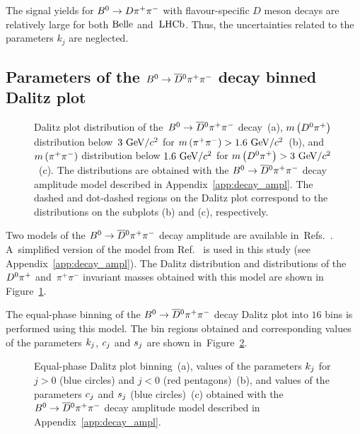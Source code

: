 \documentclass[a4paper,11pt]{article}
\begin{document}
The signal yields for $B^0\to D\pi^+\pi^-$ with flavour-specific $D$ 
meson decays are relatively large for both $\mathrm{Belle}$ and~$\mathrm{LHCb}$.  Thus, 
the uncertainties related to the parameters $k_j$ are neglected.

\subsection{Parameters of the \texorpdfstring{$B^0\to\overline{D}{}^0\pi^+\pi^-$}{B0 -> anti-D0 pi+ pi-} 
decay binned Dalitz plot} \label{sec:model} 
\begin{figure}
 \centering
{}
\caption{Dalitz plot distribution of the~$B^0\to\overline{D}{}^0\pi^+\pi^-$ decay~(a), 
$m\left(D^0\pi^+\right)$ distribution below~$3~\mathrm{GeV}/c^{2}$ for 
$m\left(\pi^+\pi^-\right)>1.6~\mathrm{GeV}/c^{2}$~(b), and $m\left(\pi^+\pi^-\right)$ distribution 
below $1.6~\mathrm{GeV}/c^{2}$ for $m\left(D^0\pi^+\right)>3~\mathrm{GeV}/c^{2}$~(c).  The distributions 
are obtained with the $B^0\to\overline{D}{}^0\pi^+\pi^-$ decay amplitude model described in 
Appendix~\ref{app:decay_ampl}.  
The dashed and dot-dashed regions on the Dalitz plot correspond to the 
distributions on the subplots (b) and (c), respectively.}
\label{fig:unbinned_bdpp}
\end{figure}
Two models of the $B^0\to\overline{D}{}^0\pi^+\pi^-$ decay amplitude are available 
in~Refs.~\cite{bdpp_belle,bdpp_lhcb}.  A~simplified version of the model from 
Ref.~\cite{bdpp_belle} is used in this study (see Appendix~\ref{app:decay_ampl}).  
The Dalitz distribution and distributions of 
the~$D^0\pi^+$ and~$\pi^+\pi^-$ invariant masses obtained with this model 
are shown in Figure~\ref{fig:unbinned_bdpp}.

The equal-phase binning of the $B^0\to\overline{D}{}^0\pi^+\pi^-$ decay Dalitz plot into $16$ bins is 
performed using this model.  The bin regions obtained and corresponding 
values of the parameters $k_j$, $c_j$ and $s_j$ are shown 
in~Figure~\ref{fig:binned_bdpp}.

\begin{figure}
 \centering
{}%
  \hspace{0.01 cm}%
\subfloat[]{\label{fig:dpp_k}    \texttt{[image: k1]}}%
  \hspace{0.01 cm}%
\subfloat[]{\label{fig:dpp_cs}   \texttt{[image: cs]}}%
\caption{Equal-phase Dalitz plot binning~(a), values of the parameters $k_j$ 
for $j>0$ (blue circles) and $j<0$ (red pentagons)~(b), and values of the 
parameters $c_j$ and $s_j$ (blue circles)~(c) obtained with the $B^0\to\overline{D}{}^0\pi^+\pi^-$ decay 
amplitude model described in Appendix~\ref{app:decay_ampl}.}
\label{fig:binned_bdpp}
\end{figure}
\end{document}
